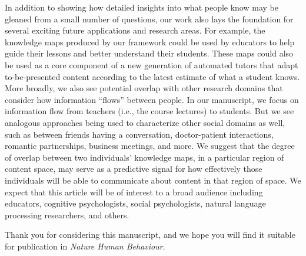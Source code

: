 \documentclass[11pt,stdletter,orderfromtodate,sigleft]{newlfm}
\newcommand{\journal}{Nature Human Behaviour}
\begin{document}
\begin{newlfm}
In addition to showing how detailed insights into what people know may be
gleaned from a small number of questions, our work also lays the foundation for
several exciting future applications and research areas. For example, the
knowledge maps produced by our framework could be used by educators to help
guide their lessons and better understand their students. These maps could also
be used as a core component of a new generation of automated tutors that adapt
to-be-presented content according to the latest estimate of what a student
knows. More broadly, we also see potential overlap with other research domains
that consider how information ``flows'' between people. In our manuscript, we
focus on information flow from teachers (i.e., the course lectures) to
students. But we see analogous approaches being used to characterize other
social domains as well, such as between friends having a conversation,
doctor-patient interactions, romantic partnerships, business meetings, and
more. We suggest that the degree of overlap between two individuals' knowledge
maps, in a particular region of content space, may serve as a predictive signal
for how effectively those individuals will be able to communicate about content
in that region of space. We expect that this article will be of
interest to a broad audience including educators, cognitive psychologists,
social psychologists, natural language processing researchers, and others.

Thank you for considering this manuscript, and we hope you will find it suitable
for publication in \textit{\journal}.


\end{newlfm}
\end{document}
